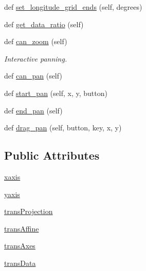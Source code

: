 \begin{DoxyCompactItemize}
\item 
def \hyperlink{classmatplotlib_1_1projections_1_1geo_1_1GeoAxes_ab70fcd436cc799757c7f96c06d364f18}{set\+\_\+longitude\+\_\+grid\+\_\+ends} (self, degrees)
\item 
def \hyperlink{classmatplotlib_1_1projections_1_1geo_1_1GeoAxes_a109bcf20d4c8d980b37b9aa1e643a291}{get\+\_\+data\+\_\+ratio} (self)
\item 
def \hyperlink{classmatplotlib_1_1projections_1_1geo_1_1GeoAxes_ae7d86cc5bfbcffe6498c3658d27fa81d}{can\+\_\+zoom} (self)
\begin{DoxyCompactList}\small\item\em Interactive panning. \end{DoxyCompactList}\item 
def \hyperlink{classmatplotlib_1_1projections_1_1geo_1_1GeoAxes_a32110f4baabfeefadf46c1c4b0808a9d}{can\+\_\+pan} (self)
\item 
def \hyperlink{classmatplotlib_1_1projections_1_1geo_1_1GeoAxes_a15510de919b1bdf5a7e3021b2727d1f1}{start\+\_\+pan} (self, x, y, button)
\item 
def \hyperlink{classmatplotlib_1_1projections_1_1geo_1_1GeoAxes_af3841c5eca5c9f3dcc6e86526b8efd37}{end\+\_\+pan} (self)
\item 
def \hyperlink{classmatplotlib_1_1projections_1_1geo_1_1GeoAxes_acf91085372fa045dd21d1b31e9a6a6c3}{drag\+\_\+pan} (self, button, key, x, y)
\end{DoxyCompactItemize}
\subsection*{Public Attributes}
\begin{DoxyCompactItemize}
\item 
\hyperlink{classmatplotlib_1_1projections_1_1geo_1_1GeoAxes_accf2ea9b87c9b5fa6bb86ea0dd882860}{xaxis}
\item 
\hyperlink{classmatplotlib_1_1projections_1_1geo_1_1GeoAxes_ae48143245d1055bc2bbc4e680516d128}{yaxis}
\item 
\hyperlink{classmatplotlib_1_1projections_1_1geo_1_1GeoAxes_abd6ba6269634a040b278f875dd2cdb51}{trans\+Projection}
\item 
\hyperlink{classmatplotlib_1_1projections_1_1geo_1_1GeoAxes_a129c73e942bd1977da7b774823a5e3d2}{trans\+Affine}
\item 
\hyperlink{classmatplotlib_1_1projections_1_1geo_1_1GeoAxes_a03841ad352eb17f004d4392c85a2b864}{trans\+Axes}
\item 
\hyperlink{classmatplotlib_1_1projections_1_1geo_1_1GeoAxes_a570d7ed2e46ae956ab695a52fd7e10ae}{trans\+Data}
\end{DoxyCompactItemize}
